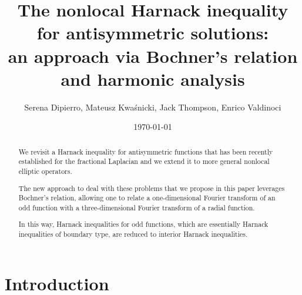 \documentclass[a4paper,12pt,reqno]{amsart}
\numberwithin{equation}{section}
\theoremstyle{definition}
\theoremstyle{notation}
\begin{document}
\date{\today}


\title[The nonlocal Harnack inequality for antisymmetric solutions]{The nonlocal Harnack inequality \\ for antisymmetric solutions: \\
an approach via Bochner's relation and harmonic analysis}


\author[S. Dipierro, M.~Kwa\'snicki, J. Thompson, E. Valdinoci]{Serena Dipierro,
Mateusz Kwa\'snicki, Jack Thompson, Enrico Valdinoci}
\address{Serena Dipierro: Department of Mathematics and Statistics,
The University of Western Australia, 35 Stirling Highway, Crawley, Perth, WA 6009, Australia.}
\address{Mateusz Kwa\'snicki: Department of Pure Mathematics, Wroc\l{}aw University of Science and Technology, Wyb.\@ Wyspia\'nskiego 27, 50-370 Wroc\l{}aw, Poland.}
\address{Jack Thompson: Department of Mathematics and Statistics,
The University of Western Australia, 35 Stirling Highway, Crawley, Perth, WA 6009, Australia.}
\address{Enrico Valdinoci: Department of Mathematics and Statistics, The University of Western Australia, 35 Stirling Highway, Crawley, Perth, WA 6009, Australia.}


\begin{abstract} We revisit a Harnack inequality for antisymmetric functions
that has been recently established for the fractional Laplacian and we extend it to
more general nonlocal elliptic operators.


The new approach to deal with these problems that we propose in this paper
leverages Bochner's relation, allowing one to
relate a one-dimensional Fourier transform of an odd function with a three-dimensional Fourier transform of a radial function.


In this way, Harnack inequalities for odd functions, which are essentially 
Harnack inequalities of boundary type, are reduced to interior Harnack inequalities.
\end{abstract}


\maketitle


%
%


\section{Introduction}
\end{document}
